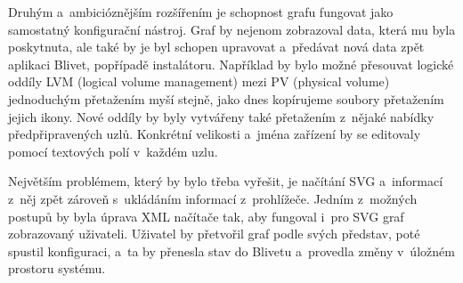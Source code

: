\documentclass[printed,color,table,oneside,nolot,nolof]{fithesis}
\begin{document}
	Druhým a~ambicióznějším rozšířením je schopnost grafu fungovat jako samostatný konfigurační nástroj. Graf by nejenom zobrazoval data, která mu byla poskytnuta, ale také by je byl
	schopen upravovat a~předávat nová data zpět aplikaci Blivet, popřípadě instalátoru. Například by bylo možné přesouvat logické oddíly LVM (logical volume
	management) mezi PV (physical volume) jednoduchým 
	přetažením myší stejně, jako dnes kopírujeme soubory přetažením jejich ikony. Nové oddíly by byly vytvářeny také přetažením z~nějaké nabídky předpřipravených uzlů. Konkrétní velikosti
	a~jména zařízení by se editovaly pomocí textových polí v~každém uzlu.
	
	Největším problémem, který by bylo třeba vyřešit, je načítání SVG a~informací z~něj zpět zároveň s~ukládáním informací z~prohlížeče. 
	Jedním z~možných postupů by byla úprava XML načítače tak, aby fungoval i~pro SVG graf zobrazovaný uživateli. Uživatel by přetvořil graf podle svých představ, poté spustil 
	konfiguraci, a~ta by přenesla stav do Blivetu a~provedla změny v~úložném prostoru systému. 

	\printbibliography
\end{document}
